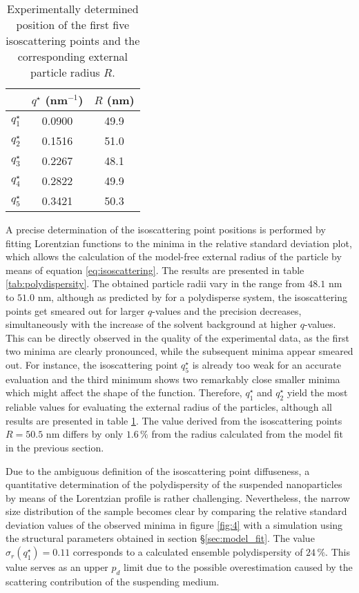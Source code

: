 \begin{table}
\caption{Experimentally determined position of the first five isoscattering points and the corresponding external particle radius $R$.}
\begin{tabular}{l|cc}
 & \( q^{\star} \) (nm\(^{-1}\))    &  \(R\) (nm) \\
\hline
 \(q^{\star}_1\) &  0.0900 & 49.9 \\
 \(q^{\star}_2\) &  0.1516 & 51.0  \\
 \(q^{\star}_3\) &  0.2267 & 48.1   \\
 \(q^{\star}_4\) &  0.2822 & 49.9    \\
 \(q^{\star}_5\) &  0.3421 & 50.3     \\
\end{tabular}
\label{tab:isopoint_Kisker}
\end{table}

A precise determination of the isoscattering point positions is performed by fitting Lorentzian functions to the minima in the relative standard deviation plot, which allows the calculation of the model-free external radius of the particle by means of equation \eqref{eq:isoscattering}. The results are presented in table \ref{tab:polydispersity}. The obtained particle radii vary in the range from \(48.1\) nm to \(51.0\) nm, although as predicted by \cite{kawaguchi_isoscattering_1992-1} for a polydisperse system, the isoscattering points get smeared out for larger \( q \)-values and the precision decreases, simultaneously with the increase of the solvent background at higher \(q\)-values. This can be directly observed in the quality of the experimental data, as the first two minima are clearly pronounced, while the subsequent minima appear smeared out. For instance, the isoscattering point \(q^{\star}_5\) is already too weak for an accurate evaluation and the third minimum shows two remarkably close smaller minima which might affect the shape of the function. Therefore, \(q^{\star}_1\) and \(q^{\star}_2\) yield the most reliable values for evaluating the external radius of the particles, although all results are presented in table \ref{tab:isopoint_Kisker}. The value derived from the isoscattering points \(R=50.5\) nm differs by only \(1.6\,\%\) from the radius calculated from the model fit in the previous section.

Due to the ambiguous definition of the isoscattering point diffuseness, a quantitative determination of the polydispersity of the suspended nanoparticles by means of the Lorentzian profile is rather challenging. Nevertheless, the narrow size distribution of the sample becomes clear by comparing the relative standard deviation values of the observed minima in figure \ref{fig:4} with a simulation using the structural parameters obtained in section \S\ref{sec:model_fit}. The value \( \sigma_r(q^{\star}_1)=0.11 \) corresponds to a calculated ensemble polydispersity of \(24\,\% \). This value serves as an upper \( p_d \) limit due to the possible overestimation caused by the scattering contribution of the suspending medium.


